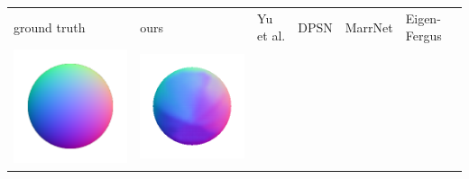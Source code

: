 \begin{center}
\begin{tabularx}{\linewidth}{@{}Y@{}Y@{}Y@{}Y@{}Y@{}Y@{}}
ground truth & ours & Yu et al. & DPSN & MarrNet & Eigen-Fergus \\
\includegraphics[width=\linewidth]{semisynthetic/20150514_13_gt.png} &
\includegraphics[width=\linewidth]{semisynthetic/20150514_13_ours_out.png} &

\end{tabularx}
\end{center}
